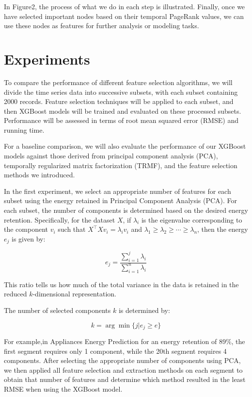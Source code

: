 \documentclass[twoside,11pt]{article}
\begin{document}
In Figure2, the process of what we do in each step is illustrated. Finally, once we have
selected important nodes based on their temporal PageRank values, we can use these nodes
as features for further analysis or modeling tasks.
\section{Experiments}


To compare the performance of different feature selection algorithms, we will divide the time series data into successive subsets, with each subset containing 2000 records. Feature selection techniques will be applied to each subset, and then XGBoost models will be trained and evaluated on these processed subsets. Performance will be assessed in terms of root mean squared error (RMSE) and running time.

For a baseline comparison, we will also evaluate the performance of our XGBoost models against those derived from principal component analysis (PCA), temporally regularized matrix factorization (TRMF), and the feature selection methods we introduced.

In the first experiment, we select an appropriate number of features for each subset using the energy retained in Principal Component Analysis (PCA).
For each subset, the number of components is determined based on the desired energy retention. Specifically, for the dataset \( X \), if \( \lambda_i \) is the eigenvalue corresponding to the component \( v_i \) such that \( X^\top X v_i = \lambda_i v_i \) and \( \lambda_1 \geq \lambda_2 \geq \cdots \geq \lambda_n \), then the energy \( e_j \) is given by:

\[
e_j = \frac{\sum_{i=1}^{j} \lambda_i}{\sum_{i=1}^{n} \lambda_i}
\]

This ratio tells us how much of the total variance in the data is retained in the reduced \( k \)-dimensional representation.

The number of selected components \( k \) is determined by:

\[
k = \arg\min \{j| e_j \geq e \}
\]

For example,in Appliances Energy Prediction for an energy retention of 89\%, the first segment requires only 1 component, while the 20th segment requires 4 components.
After selecting the appropriate number of components using PCA, we then applied all feature selection and extraction methods on each segment to obtain that number of features and determine which method resulted in the least RMSE when using the XGBoost model.
\end{document}
